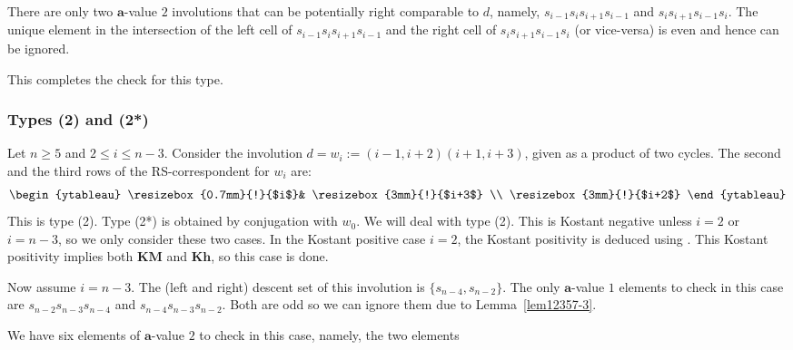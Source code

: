 \documentclass[a4paper]{amsart}
\begin{document}
There are only two $\mathbf{a}$-value $2$ involutions
that can be potentially right comparable to $d$, namely,
$s_{i-1}s_{i}s_{i+1}s_{i-1}$ and $s_{i}s_{i+1}s_{i-1}s_{i}$.
The unique element in the intersection of the left 
cell of $s_{i-1}s_{i}s_{i+1}s_{i-1}$ and the right cell
of $s_{i}s_{i+1}s_{i-1}s_{i}$ (or vice-versa) is even
and hence can be ignored.

This completes the check for this type.

\subsubsection{Types (2) and (2*)}\label{s6.2.2}

Let $n\geq 5$ and $2\leq i\leq n-3$. Consider the involution
$d=w_i:=(i-1,i+2)(i+1,i+3)$, given as a product of two cycles.
The second and the third rows of the RS-correspondent for $w_i$
are:
\begin{displaymath}
\begin{ytableau}
\resizebox{0.7mm}{!}{$i$}&
\resizebox{3mm}{!}{$i+3$}
\\
\resizebox{3mm}{!}{$i+2$} 
\end{ytableau}
\end{displaymath}
This is type (2). Type (2*) is obtained by conjugation with $w_0$.
We will deal with type (2). This is Kostant negative unless
$i=2$ or $i=n-3$, so we only consider these two cases.
In the Kostant positive case $i=2$, the Kostant positivity 
is deduced using \cite[Theorem~1.1]{Kh}. This Kostant positivity 
implies both $\mathbf{KM}$ and $\mathbf{Kh}$,
so this case is done.

Now assume $i=n-3$. The (left and right) descent set of this involution is
$\{s_{n-4},s_{n-2}\}$.
The only $\mathbf{a}$-value $1$ elements to check in this case are
$s_{n-2}s_{n-3}s_{n-4}$ and $s_{n-4}s_{n-3}s_{n-2}$. Both are odd
so we can ignore them due to Lemma~\ref{lem12357-3}.

We have six elements of $\mathbf{a}$-value $2$ to check in this case, namely,
the two elements

\end{document}
